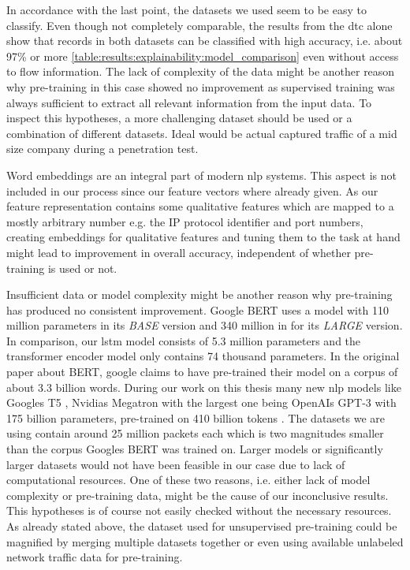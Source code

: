 In accordance with the last point, the datasets we used seem to be easy to classify. Even though not completely comparable, the results from the \gls{dtc} alone show that records in both datasets can be classified with high accuracy, i.e. about 97\% or more \ref{table:results:explainability:model_comparison} even without access to flow information.
The lack of complexity of the data might be another reason why pre-training in this case showed no improvement as supervised training was always sufficient to extract all relevant information from the input data. To inspect this hypotheses, a more challenging dataset should be used or a combination of different datasets. Ideal would be actual captured traffic of a mid size company during a penetration test. \par

Word embeddings are an integral part of modern \gls{nlp} systems. This aspect is not included in our process since our feature vectors where already given. As our feature representation contains some qualitative features which are mapped to a mostly arbitrary number e.g. the IP protocol identifier and port numbers, creating embeddings for qualitative features and tuning them to the task at hand might lead to improvement in overall accuracy, independent of whether pre-training is used or not. \par
	
Insufficient data or model complexity might be another reason why pre-training has produced no consistent improvement. Google BERT \cite{bert} uses a model with 110 million parameters in its \textit{BASE} version and 340 million in for its \textit{LARGE} version. In comparison, our \gls{lstm} model consists of 5.3 million parameters and the transformer encoder model only contains 74 thousand parameters. In the original paper about BERT, google claims to have pre-trained their model on a corpus of about 3.3 billion words. During our work on this thesis many new \gls{nlp} models like Googles T5 \cite{google_t5}, Nvidias Megatron \cite{megatron} with the largest one being OpenAIs GPT-3 with 175 billion parameters, pre-trained on 410 billion tokens \cite{gpt3}. The datasets we are using contain around 25 million packets each which is two magnitudes smaller than the corpus Googles BERT was trained on. Larger models or significantly larger datasets would not have been feasible in our case due to lack of computational resources. One of these two reasons, i.e. either lack of model complexity or pre-training data, might be the cause of our inconclusive results. This hypotheses is of course not easily checked without the necessary resources. As already stated above, the dataset used for unsupervised pre-training could be magnified by merging multiple datasets together or even using available unlabeled network traffic data for pre-training. \par

